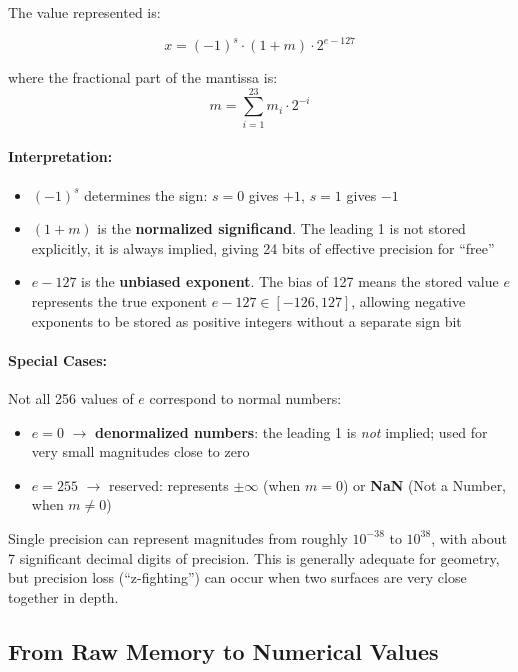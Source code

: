 \documentclass[11pt]{article}
\begin{document}
The value represented is:

\begin{equation}
    x = (-1)^s \cdot (1 + m) \cdot 2^{e - 127}
\end{equation}

where the fractional part of the mantissa is:
\begin{equation}
    m = \sum_{i=1}^{23} m_i \cdot 2^{-i}
\end{equation}

\paragraph{Interpretation:}
\begin{itemize}
    \item $(-1)^s$ determines the sign: $s=0$ gives $+1$, $s=1$ gives $-1$
    \item $(1 + m)$ is the \textbf{normalized significand}. The leading 1 is not stored explicitly, it is always implied, giving 24 bits of effective precision for ``free''
    \item $e - 127$ is the \textbf{unbiased exponent}. The bias of 127 means the stored value $e$ represents the true exponent $e - 127 \in [-126, 127]$, allowing negative exponents to be stored as positive integers without a separate sign bit
\end{itemize}

\paragraph{Special Cases:}

Not all 256 values of $e$ correspond to normal numbers:
\begin{itemize}
    \item $e = 0$ $\rightarrow$ \textbf{denormalized numbers}: the leading 1 is \emph{not} implied; used for very small magnitudes close to zero
    \item $e = 255$ $\rightarrow$ reserved: represents $\pm\infty$ (when $m = 0$) or \textbf{NaN} (Not a Number, when $m \neq 0$)
\end{itemize}

Single precision can represent magnitudes from roughly $10^{-38}$ to $10^{38}$, with about 7 significant decimal digits of precision. This is generally adequate for geometry, but precision loss (``z-fighting'') can occur when two surfaces are very close together in depth.

\subsection{From Raw Memory to Numerical Values}
\end{document}
